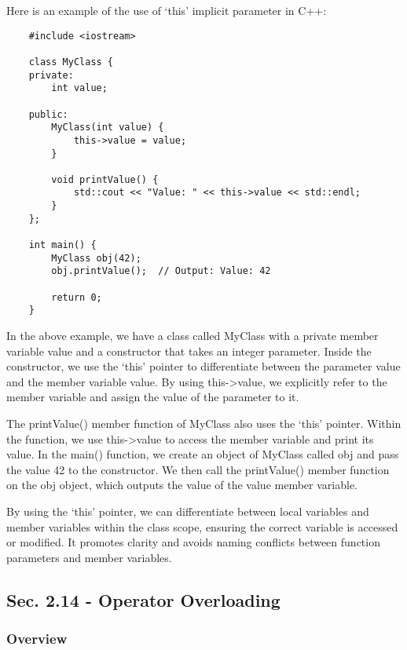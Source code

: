 \begin{solution}
    Here is an example of the use of `this' implicit parameter in C++: \\
    \horizontalline
    \begin{verbatim}
    #include <iostream>

    class MyClass {
    private:
        int value;
    
    public:
        MyClass(int value) {
            this->value = value;
        }
    
        void printValue() {
            std::cout << "Value: " << this->value << std::endl;
        }
    };
    
    int main() {
        MyClass obj(42);
        obj.printValue();  // Output: Value: 42
    
        return 0;
    }
    \end{verbatim}
    
    \horizontalline

    In the above example, we have a class called MyClass with a private member variable value and a constructor that takes an integer parameter. Inside the constructor, we use the `this' pointer to differentiate between the parameter value and the member variable value. By using this->value, we explicitly 
    refer to the member variable and assign the value of the parameter to it.

    \noindent The printValue() member function of MyClass also uses the `this' pointer. Within the function, we use this->value to access the member variable and print its value. In the main() function, we create an object of MyClass called obj and pass the value 42 to the constructor. We then call the 
    printValue() member function on the obj object, which outputs the value of the value member variable.

    \noindent By using the `this' pointer, we can differentiate between local variables and member variables within the class scope, ensuring the correct variable is accessed or modified. It promotes clarity and avoids naming conflicts between function parameters and member variables.
\end{solution}

\subsection*{Sec. 2.14 - Operator Overloading}
\subsubsection*{Overview}

